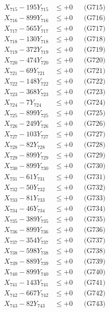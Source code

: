 \documentclass[a4paper,10pt]{article}
\begin{document}
{\begin{align}
X_{715} - 195Y_{715} &\leq +0 && \text{(G715)} \\
X_{716} - 899Y_{716} &\leq +0 && \text{(G716)} \\
X_{717} - 565Y_{717} &\leq +0 && \text{(G717)} \\
X_{718} - 130Y_{718} &\leq +0 && \text{(G718)} \\
X_{719} - 372Y_{719} &\leq +0 && \text{(G719)} \\
X_{720} - 474Y_{720} &\leq +0 && \text{(G720)} \\
\allowbreak
X_{721} - 69Y_{721} &\leq +0 && \text{(G721)} \\
X_{722} - 148Y_{722} &\leq +0 && \text{(G722)} \\
X_{723} - 368Y_{723} &\leq +0 && \text{(G723)} \\
X_{724} - 7Y_{724} &\leq +0 && \text{(G724)} \\
X_{725} - 899Y_{725} &\leq +0 && \text{(G725)} \\
X_{726} - 249Y_{726} &\leq +0 && \text{(G726)} \\
X_{727} - 103Y_{727} &\leq +0 && \text{(G727)} \\
X_{728} - 82Y_{728} &\leq +0 && \text{(G728)} \\
X_{729} - 899Y_{729} &\leq +0 && \text{(G729)} \\
X_{730} - 899Y_{730} &\leq +0 && \text{(G730)} \\
\allowbreak
X_{731} - 61Y_{731} &\leq +0 && \text{(G731)} \\
X_{732} - 50Y_{732} &\leq +0 && \text{(G732)} \\
X_{733} - 81Y_{733} &\leq +0 && \text{(G733)} \\
X_{734} - 46Y_{734} &\leq +0 && \text{(G734)} \\
X_{735} - 389Y_{735} &\leq +0 && \text{(G735)} \\
X_{736} - 899Y_{736} &\leq +0 && \text{(G736)} \\
X_{737} - 354Y_{737} &\leq +0 && \text{(G737)} \\
X_{738} - 598Y_{738} &\leq +0 && \text{(G738)} \\
X_{739} - 889Y_{739} &\leq +0 && \text{(G739)} \\
X_{740} - 899Y_{740} &\leq +0 && \text{(G740)} \\
\allowbreak
X_{741} - 143Y_{741} &\leq +0 && \text{(G741)} \\
X_{742} - 667Y_{742} &\leq +0 && \text{(G742)} \\
X_{743} - 82Y_{743} &\leq +0 && \text{(G743)} \\

\end{align}}
\end{document}
